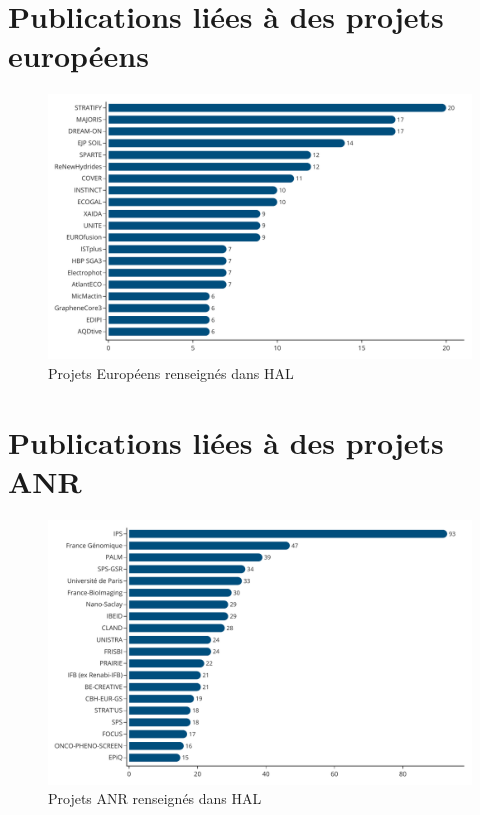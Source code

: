 \documentclass[french, 11pt]{dibiso/biso}
\begin{document}
{\footnotesize\privatesectorcollaborationsinfo}








\pagebreak

\section{Publications liées à des projets européens}

\begin{figure}[!h]
  \includegraphics[width=.85\textwidth]{figures/european_projects.pdf}
  \centering
  \caption{Projets Européens renseignés dans HAL}
  \label{fig_eu_projects}
\end{figure}

{\footnotesize\europeanprojectsinfo}

\section{Publications liées à des projets ANR}

\begin{figure}[!h]
  \includegraphics[width=.85\textwidth]{figures/anr_projects.pdf}
  \centering
  \caption{Projets ANR renseignés dans HAL}
  \label{fig_anr_projects}
\end{figure}
\end{document}
